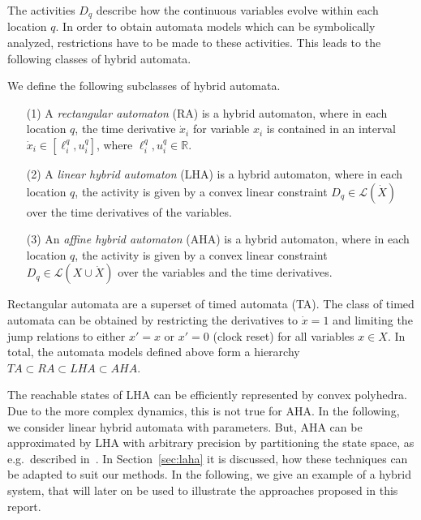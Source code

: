 \documentclass{llncs}
\newcommand{\sectionname}{Section}
\newcommand{\Reals}{\ensuremath{\mathbb{R}}}
\begin{document}
The activities $D_q$ describe how the continuous variables evolve
within each location $q$. In order to obtain automata models which can
be symbolically analyzed, restrictions have to be made to these
activities. This leads to the following classes of hybrid automata.

\begin{definition}
  We define the following subclasses of hybrid automata.

  \begin{itemize}
  \item[(1)] A \emph{rectangular automaton} (RA) is a hybrid automaton,
    where in each location $q$, the time derivative $\dot{x}_i$ for
    variable $x_i$ is contained in an interval $\dot{x}_i \in \left[
      \ell_i^q, u_i^q \right]$, where $\ell_i^q, u_i^q \in \Reals$.
    
  \item[(2)] A \emph{linear hybrid automaton} (LHA) is a hybrid automaton,
    where in each location $q$, the activity is given by a convex
    linear constraint $D_q \in \mathcal{L}(\dot{X})$ over the time
    derivatives of the variables.

  \item[(3)] An \emph{affine hybrid automaton} (AHA) is a hybrid
    automaton, where in each location $q$, the activity is given by a
    convex linear constraint $D_q \in \mathcal{L}(X \cup \dot{X})$
    over the variables and the time derivatives.
  \end{itemize}
\end{definition}

Rectangular automata are a superset of timed automata (TA). The class
of timed automata can be obtained by restricting the derivatives to
$\dot{x} = 1$ and limiting the jump relations to either $x' = x$ or
$x' = 0$ (clock reset) for all variables $x \in X$. In total, the
automata models defined above form a hierarchy $TA \subset RA \subset
LHA \subset AHA$.

The reachable states of LHA can be efficiently represented by convex
polyhedra. Due to the more complex dynamics, this is not true for
AHA. In the following, we consider linear hybrid automata with
parameters. But, AHA can be approximated by LHA with arbitrary
precision by partitioning the state space, as e.g.~described
in~\cite{Fre:2008}. In \sectionname~\ref{sec:laha} it is discussed, how
these techniques can be adapted to suit our methods. In the following,
we give an example of a hybrid system, that will later on be used to
illustrate the approaches proposed in this report. 
\end{document}
